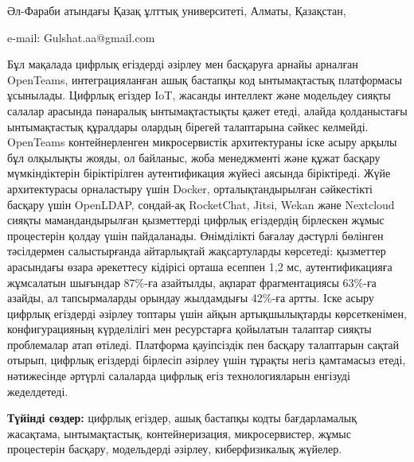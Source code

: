 \begin{affil}
Әл-Фараби атындағы Қазақ ұлттық университеті, Алматы, Қазақстан,

e-mail: Gulshat.aa@gmail.com
\end{affil}

Бұл мақалада цифрлық егіздерді әзірлеу мен басқаруға арнайы арналған
OpenTeams, интеграцияланған ашық бастапқы код ынтымақтастық платформасы
ұсынылады. Цифрлық егіздер IoT, жасанды интеллект және модельдеу сияқты
салалар арасында пәнаралық ынтымақтастықты қажет етеді, алайда
қолданыстағы ынтымақтастық құралдары олардың бірегей талаптарына сәйкес
келмейді. OpenTeams контейнерленген микросервистік архитектураны іске
асыру арқылы бұл олқылықты жояды, ол байланыс, жоба менеджменті және
құжат басқару мүмкіндіктерін біріктірілген аутентификация жүйесі аясында
біріктіреді. Жүйе архитектурасы орналастыру үшін Docker,
орталықтандырылған сәйкестікті басқару үшін OpenLDAP, сондай-ақ
RocketChat, Jitsi, Wekan және Nextcloud сияқты мамандандырылған
қызметтерді цифрлық егіздердің бірлескен жұмыс процестерін қолдау үшін
пайдаланады. Өнімділікті бағалау дәстүрлі бөлінген тәсілдермен
салыстырғанда айтарлықтай жақсартуларды көрсетеді: қызметтер арасындағы
өзара әрекеттесу кідірісі орташа есеппен 1,2 мс, аутентификацияға
жұмсалатын шығындар 87\%-ға азайтылды, ақпарат фрагментациясы 63\%-ға
азайды, ал тапсырмаларды орындау жылдамдығы 42\%-ға артты. Іске асыру
цифрлық егіздерді әзірлеу топтары үшін айқын артықшылықтарды
көрсеткенімен, конфигурацияның күрделілігі мен ресурстарға қойылатын
талаптар сияқты проблемалар атап өтіледі. Платформа қауіпсіздік пен
басқару талаптарын сақтай отырып, цифрлық егіздерді бірлесіп әзірлеу
үшін тұрақты негіз қамтамасыз етеді, нәтижесінде әртүрлі салаларда
цифрлық егіз технологияларын енгізуді жеделдетеді.

{\bfseries Түйінді сөздер:} цифрлық егіздер, ашық бастапқы кодты
бағдарламалық жасақтама, ынтымақтастық, контейнеризация, микросервистер,
жұмыс процестерін басқару, модельдерді әзірлеу, киберфизикалық жүйелер.

